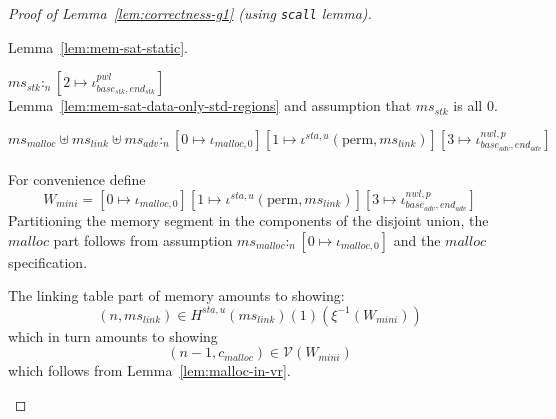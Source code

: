 \documentclass[a4paper]{article}
\newcommand{\var}[1]{\mathit{#1}}
\newcommand{\hs}{\var{ms}}
\newcommand{\ms}{\hs}
\newcommand{\start}{\var{base}}
\newcommand{\addrend}{\var{end}}
\newcommand{\heap}{\var{mem}}
\newcommand{\adv}{\var{adv}}
\newcommand{\link}{\var{link}}
\newcommand{\stk}{\var{stk}}
\newcommand{\nwl}{\var{nwl}}
\newcommand{\pwl}{\var{pwl}}
\newcommand{\sta}{\var{sta}}
\newcommand{\heapSat}[3][\heap]{#1 :_{#2} #3}
\newcommand{\memSat}[3][n]{\heapSat[#2]{#1}{#3}}
\newcommand{\codelabel}[1]{\mathit{#1}}
\newcommand{\malloc}{\codelabel{malloc}}
\newcommand{\asmType}{\plaindom{AsmType}}
\newcommand{\plaindom}[1]{\mathrm{#1}}
\newcommand{\intr}[2]{\mathcal{#1}}
\newcommand{\valueintr}[1]{\intr{V}{#1}}
\newcommand{\stdvr}{\valueintr{\asmType}}
\newcommand{\npair}[2][n]{\left(#1,#2 \right)}
\newcommand{\plainview}[1]{\mathrm{#1}}
\newcommand{\perma}{\plainview{perm}}
\begin{document}
\begin{proof}[Proof of Lemma~\ref{lem:correctness-g1} (using \texttt{scall} lemma)]
\begin{enumproof}[resume]
\begin{enumproof}
          Lemma~\ref{lem:mem-sat-static}.
        \item $\memSat{\ms_\stk}{[2 \mapsto \iota^\pwl_{\start_\stk,\addrend_\stk}]}$ \label{pf:g1-3-2}\\
          Lemma~\ref{lem:mem-sat-data-only-std-regions} and assumption that $\ms_\stk$ is all 0.
        \item $\memSat{\ms_{\malloc} \uplus \ms_\link \uplus \ms_\adv}{[0 \mapsto \iota_{\malloc,0}][1 \mapsto \iota^{\sta,u} (\perma,\ms_\link)][3 \mapsto \iota^{\nwl,p}_{\start_\adv,\addrend_\adv}]}$ \label{pf:g1-3-3}\\
          For convenience define
          \[
            W_{\var{mini}} = [0 \mapsto \iota_{\malloc,0}][1 \mapsto \iota^{\sta,u} (\perma,\ms_\link)][3 \mapsto \iota^{\nwl,p}_{\start_\adv,\addrend_\adv}]
          \]
          Partitioning the memory segment in the components of the disjoint union, the $\malloc$ part follows from assumption $\memSat{\ms_\malloc}{[0 \mapsto \iota_{\malloc,0}]}$ and the $\malloc$ specification.

          The linking table part of memory amounts to showing:
          \[
            \npair[n]{\ms_\link} \in H^{\sta,u}(\ms_\link)(1)(\xi^{-1}(W_{\var{mini}}))
          \]
          which in turn amounts to showing
          \[
            \npair[n-1]{c_\malloc} \in \stdvr(W_{\var{mini}})
          \]
          which follows from Lemma~\ref{lem:malloc-in-vr}.


\end{enumproof}
\end{enumproof}
\end{proof}
\end{document}
